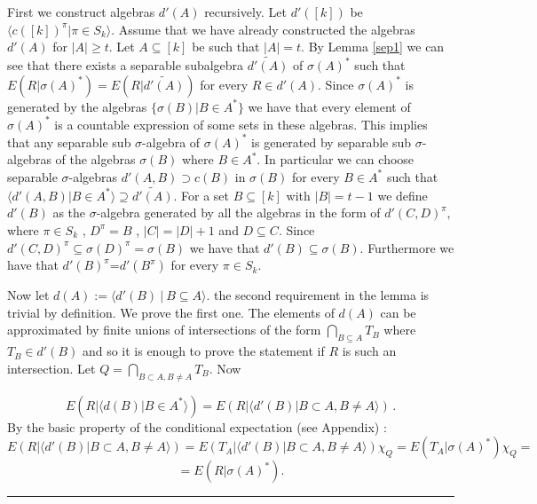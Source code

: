 \documentclass [11pt] {article}
\newcommand{\qed} {\hspace {0.1in} \rule {1.5mm} {3.5mm}}
\def\proof{\smallskip\noindent{\it Proof.} }
\begin{document}
\proof First we construct algebras $d'(A)$
  recursively. Let $d'([k])$ be
  $\langle c([k])^\pi|\pi\in S_k\rangle$.
Assume that we have already constructed the algebras $d'(A)$ for
  $|A|\geq t$. Let $A\subseteq[k]$ be such that $|A|=t$. By Lemma \ref{sep1}
  we can see that there exists a separable subalgebra $\widetilde{d'(A)}$ of
$\sigma(A)^*$ such that
  $E(R|\sigma(A)^*)=E(R|\widetilde{d'(A)})$ for every $R\in d'(A)$.
Since $\sigma(A)^*$ is
  generated by the algebras $\{\sigma(B)|B\in A^*\}$ we have that
  every element of $\sigma(A)^*$ is a countable expression of some
  sets in these algebras. This implies that any separable sub $\sigma$-algebra
  of $\sigma(A)^*$ is generated by separable sub
  $\sigma$-algebras of the algebras $\sigma(B)$ where $B\in A^*$.
In particular we can choose
 separable $\sigma$-algebras $d'(A,B)\supset c(B)$ in
$\sigma(B)$ for every $B\in A^*$ such
 that $\langle d'(A,B)|B\in A^*\rangle\supseteq \widetilde{d'(A)}$. For a set
 $B\subseteq[k]$ with $|B|=t-1$ we define $d'(B)$ as the $\sigma$-algebra
 generated by all the algebras in the form of $d'(C,D)^\pi$,
where $\pi\in S_k$ , $D^\pi=B$ ,
 $|C|=|D|+1$ and $D\subseteq C$. Since
 $d'(C,D)^\pi\subseteq\sigma(D)^\pi=\sigma(B)$ we have that
 $d'(B)\subseteq\sigma(B)$. Furthermore we have that
 $d'(B)^\pi$=$d'(B^\pi)$ for every $\pi\in S_k$.

Now let $d(A):=\langle d'(B)~|~B\subseteq A\rangle$. the second
requirement in the lemma is trivial by definition. We prove the
first one. The elements of $d(A)$ can be approximated by finite
unions of intersections of the form $\bigcap_{B\subseteq A}T_B$
where $T_B\in d'(B)$ and so it is enough to prove the statement if
$R$ is such an intersection. Let $Q=\bigcap_{B\subset A,B\neq
A}T_B$. Now

$$E(R|\langle d(B)|B\in A^*\rangle)=E(R|\langle d'(B)|B\subset
A,B\neq A\rangle)\,.$$ By the basic property of the conditional expectation
(see Appendix) :
$$E(R|\langle d'(B)|B\subset
A,B\neq A\rangle)=E(T_A|\langle d'(B)|B\subset A,B\neq A\rangle)
\chi_Q=E(T_A|\sigma(A)^*)\chi_Q=$$$$=E(R|\sigma(A)^*).$$
\qed
\end{document}
